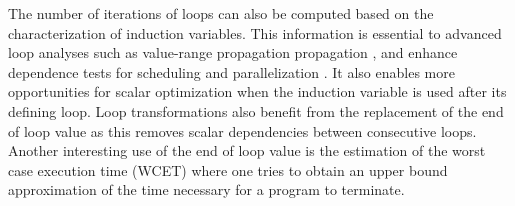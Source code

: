 The number of iterations of loops can also be computed based on the
characterization of induction variables.  This information is
essential to advanced loop analyses such as value-range propagation
propagation \cite{VRP}, and enhance dependence tests for scheduling
and parallelization \cite{Ban88,Pug91}.  It also enables more
opportunities for scalar optimization when the induction variable is
used after its defining loop.  Loop transformations also benefit from
the replacement of the end of loop value as this removes scalar
dependencies between consecutive loops.  Another interesting use of
the end of loop value is the estimation of the worst case execution
time (WCET) where one tries to obtain an upper bound approximation of
the time necessary for a program to terminate.





